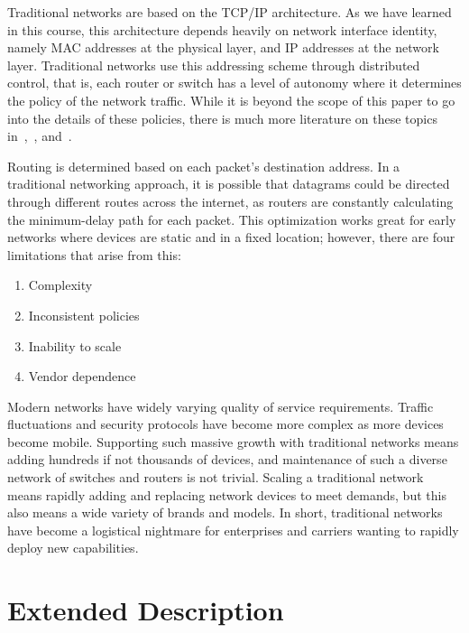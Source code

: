 \documentclass[11pt]{article}
\begin{document}
Traditional networks are based on the TCP/IP architecture. As we have learned in this course, this architecture depends heavily on network interface identity, namely MAC addresses at the physical layer, and IP addresses at the network layer. Traditional networks use this addressing scheme through distributed control, that is, each router or switch has a level of autonomy where it determines the policy of the network traffic. While it is beyond the scope of this paper to go into the details of these policies, there is much more literature on these topics in~\cite{Stallings},~\cite{Sandberg}, and~\cite{Kurose}.

Routing is determined based on each packet’s destination address. In a traditional networking approach, it is possible that datagrams could be directed through different routes across the internet, as routers are constantly calculating the minimum-delay path for each packet. This optimization works great for early networks where devices are static and in a fixed location; however, there are four limitations that arise from this:

\begin{enumerate}
	\item Complexity
	\item Inconsistent policies
	\item Inability to scale
	\item Vendor dependence
\end{enumerate}

Modern networks have widely varying quality of service requirements. Traffic fluctuations and security protocols have become more complex as more devices become mobile. Supporting such massive growth with traditional networks means adding hundreds if not thousands of devices, and maintenance of such a diverse network of switches and routers is not trivial. Scaling a traditional network means rapidly adding and replacing network devices to meet demands, but this also means a wide variety of brands and models. In short, traditional networks have become a logistical nightmare for enterprises and carriers wanting to rapidly deploy new capabilities.

\section{Extended Description}
\end{document}
